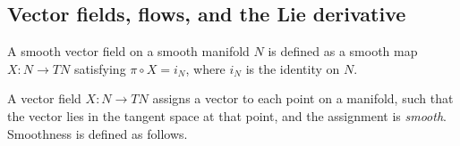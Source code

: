 \subsection{Vector fields, flows, and the Lie derivative}
\label{sec:vf_flows_lie}


\begin{defn}\label{def:vectorfield}
A smooth vector field on a smooth manifold $N$ is defined as a smooth map $X:N\rightarrow TN$ satisfying $\pi \circ X = i_N$, where $i_N$ is the identity on $N$. 
\end{defn}
A vector field $X: N \rightarrow TN$ assigns a vector to each point on a manifold, such that the vector lies in the tangent space at that point, and the assignment is \textit{smooth}. Smoothness is defined as follows. 

